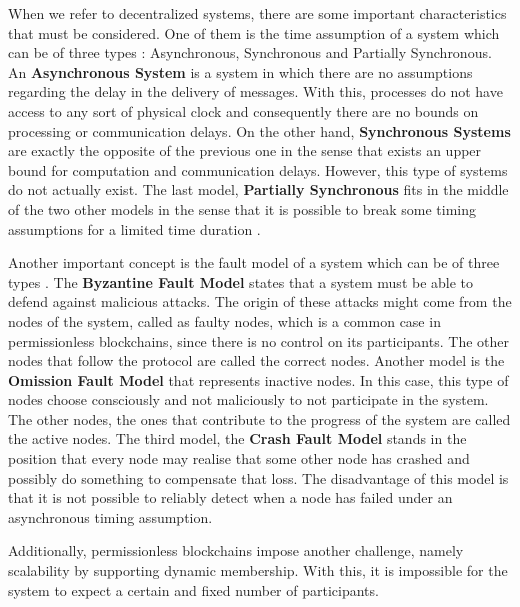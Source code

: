 
When we refer to decentralized systems, there are some important characteristics that must be considered. One of them is the time assumption of a system which can be of three types \cite{book_reliable_secure_distributed_programming}: Asynchronous, Synchronous and Partially Synchronous. An \textbf{Asynchronous System} is a system in which there are no assumptions regarding the delay in the delivery of messages. With this, processes do not have access to any sort of physical clock and consequently there are no bounds on processing or communication delays. On the other hand, \textbf{Synchronous Systems} are exactly the opposite of the previous one in the sense that exists an upper bound for computation and communication delays. However, this type of systems do not actually exist. The last model, \textbf{Partially Synchronous} fits in the middle of the two other models in the sense that it is possible to break some timing assumptions for a limited time duration \cite{consensus_partial_synchrony}.

Another important concept is the fault model of a system which can be of three types \cite{book_reliable_secure_distributed_programming}. The \textbf{Byzantine Fault Model} \cite{byzantine_generals_problem} states that a system must be able to defend against malicious attacks. The origin of these attacks might come from the nodes of the system, called as faulty nodes, which is a common case in permissionless blockchains, since there is no control on its participants. The other nodes that follow the protocol are called the correct nodes. Another model is the \textbf{Omission Fault Model} that represents inactive nodes. In this case, this type of nodes choose consciously and not maliciously to not participate in the system. The other nodes, the ones that contribute to the progress of the system are called the active nodes. The third model, the \textbf{Crash Fault Model} stands in the position that every node may realise that some other node has crashed and possibly do something to compensate that loss. The disadvantage of this model is that it is not possible to reliably detect when a node has failed under an asynchronous timing assumption.

Additionally, permissionless blockchains impose another challenge, namely scalability by supporting dynamic membership. With this, it is impossible for the system to expect a certain and fixed number of participants.

